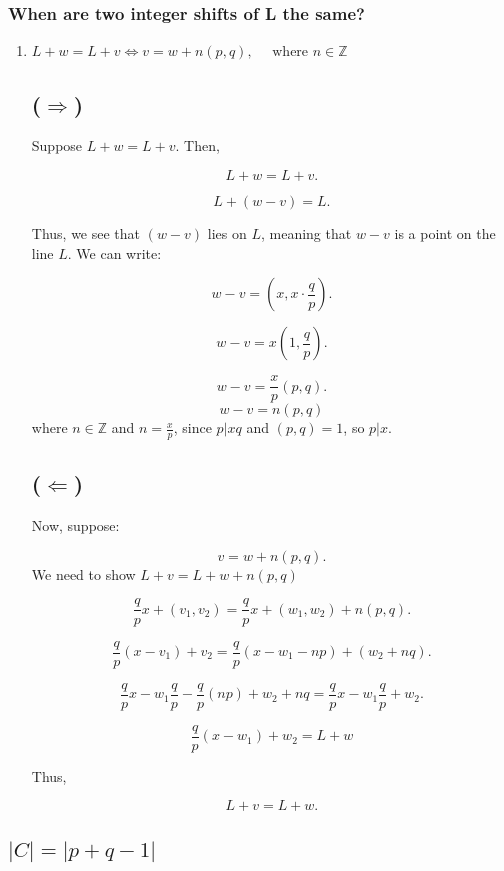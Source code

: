 \documentclass[11pt]{article}
\begin{document}
\subsubsection{When are two integer shifts of L the same?}
\label{sec:orgc6b8a13}
\begin{enumerate}
\item \(L+ w = L + v \iff v = w + n(p,q), \quad \text{ where } n \in \mathbb{Z}\)
\label{sec:orga6701d4}

\subsection*{(\(\Rightarrow\))}

Suppose \(L + w = L + v\). Then,

\[
L + w = L + v.
\]

\[
L + (w - v) = L.
\]

Thus, we see that \((w - v)\) lies on \(L\), meaning that \(w - v\) is a point on the line \(L\). We can write:

\[
w - v = (x, x \cdot \frac{q}{p}).
\]

\[
w - v = x \left(1, \frac{q}{p} \right).
\]


\[
w - v = \frac{x}{p} (p, q).
\]
\[
w - v = n (p,q)
\]
\indent where \(n \in \mathbb{Z}\) and \(n = \frac{x}{p}\), since \(p|xq\) and  \((p,q) = 1\),  so  \(p|x\). 


\subsection*{(\(\Leftarrow\))}

Now, suppose:

\[
v = w + n(p,q).
\]
\noindent
We need to show \(L + v = L + w + n(p,q)\)

\[
\frac{q}{p} x + (v_1, v_2) = \frac{q}{p} x + (w_1, w_2) + n (p,q).
\]

\[
\frac{q}{p} (x - v_1) + v_2 = \frac{q}{p} (x - w_1 - np) + (w_2 + nq).
\]

\[
\frac{q}{p} x - w_1 \frac{q}{p} - \frac{q}{p} (np) + w_2 + nq = \frac{q}{p} x - w_1 \frac{q}{p} + w_2.
\]

\[
\frac{q}{p} (x - w_1) + w_2 = L + w
\]

Thus, 

\[
L + v = L + w.
\]
\end{enumerate}



\subsection{\(|C| = |p + q - 1|\)}
\label{sec:org3199321}
\end{document}
